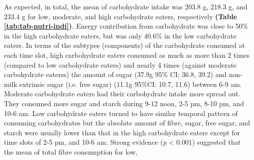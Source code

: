 As expected, in total, the mean of carbohydrate intake was 203.8 g, 218.3 g, and 233.4 g for low, moderate, and high carbohydrate eaters, respectively \textbf{(Table \ref{tab:tab-nutri-indi})}. Energy contribution from carbohydrate was close to 50\% in the high carbohydrate eaters, but was only 40.6\% in the low carbohydrate eaters. In terms of the subtypes (components) of the carbohydrate consumed at each time slot, high carbohydrate eaters consumed as much as more than 2 times (compared to low carbohydrate eaters) and nearly 4 times (against moderate carbohydrate eaterss) the amount of sugar (37.9g 95\% CI: 36.8, 39.2) and non-milk extrinsic sugar (i.e. free sugar) (11.1g 95\%CI: 10.7, 11.6) between 6-9 am. Moderate carbohydrate eaters had their carbohydrate intake more spread out. They consumed more sugar and starch during 9-12 noon, 2-5 pm, 8-10 pm, and 10-6 am. Low carbohydrate eaters turned to have similar temporal pattern of consuming carbohydrates but the absolute amount of fibre, sugar, free sugar, and starch were usually lower than that in the high carbohydrate eaters except for time slots of 2-5 pm, and 10-6 am. Strong evidence (\textit{p} < 0.001) suggested that the mean of total fibre consumption for low,





